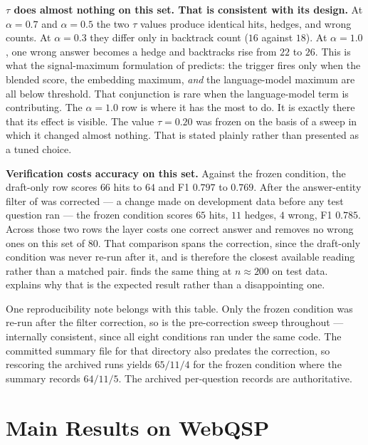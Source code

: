 \textbf{$\tau$ does almost nothing on this set. That is consistent with its
design.} At $\alpha = 0.7$ and $\alpha = 0.5$ the two $\tau$ values produce
identical hits, hedges, and wrong counts. At $\alpha = 0.3$ they differ only in
backtrack count ($16$ against $18$). At $\alpha = 1.0$, one wrong answer becomes
a hedge and backtracks rise from $22$ to $26$. This is what the signal-maximum
formulation of  predicts: the trigger fires only when the
blended score, the embedding maximum, \emph{and} the language-model maximum are
all below threshold. That conjunction is rare when the language-model term is
contributing. The $\alpha = 1.0$ row is where it has the most to do. It is
exactly there that its effect is visible. The value $\tau = 0.20$ was frozen on
the basis of a sweep in which it changed almost nothing. That is stated plainly
rather than presented as a tuned choice.

\textbf{Verification costs accuracy on this set.} Against the frozen condition,
the draft-only row scores $66$ hits to $64$ and F1 $0.797$ to $0.769$. After the
answer-entity filter of  was corrected --- a change
made on development data before any test question ran --- the frozen condition
scores $65$ hits, $11$ hedges, $4$ wrong, F1 $0.785$. Across those two rows the
layer costs one correct answer and removes no wrong ones on this set of $80$.
That comparison spans the correction, since the draft-only condition was never
re-run after it, and is therefore the closest available reading rather than a
matched pair.  finds the same thing at $n \approx 200$ on
test data.  explains why that is the expected result
rather than a disappointing one.

One reproducibility note belongs with this table. Only the frozen condition was
re-run after the filter correction, so  is the pre-correction
sweep throughout --- internally consistent, since all eight conditions ran under
the same code. The committed summary file for that directory also predates the
correction, so rescoring the archived runs yields $65/11/4$ for the frozen
condition where the summary records $64/11/5$. The archived per-question records
are authoritative.

\section{Main Results on WebQSP}\label{sec:webqsp-results}

